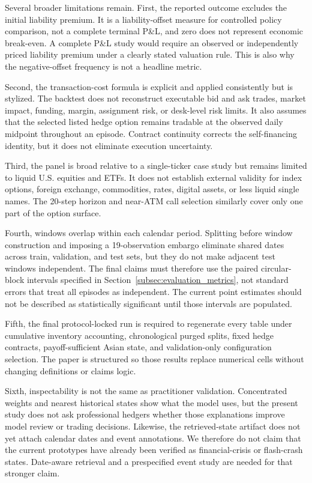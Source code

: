 \documentclass[sigconf]{acmart}
\begin{document}
Several broader limitations remain. First, the reported outcome excludes the
initial liability premium. It is a liability-offset measure for controlled
policy comparison, not a complete terminal P\&L, and zero does not represent
economic break-even. A complete P\&L study would require an observed or
independently priced liability premium under a clearly stated valuation rule.
This is also why the negative-offset frequency is not a headline metric.

Second, the transaction-cost formula is explicit and applied consistently but
is stylized. The backtest does not reconstruct executable bid and ask trades,
market impact, funding, margin, assignment risk, or desk-level risk limits. It
also assumes that the selected listed hedge option remains tradable at the
observed daily midpoint throughout an episode. Contract continuity corrects
the self-financing identity, but it does not eliminate execution uncertainty.

Third, the panel is broad relative to a single-ticker case study but remains
limited to liquid U.S. equities and ETFs. It does not establish external
validity for index options, foreign exchange, commodities, rates, digital
assets, or less liquid single names. The 20-step horizon and near-ATM call
selection similarly cover only one part of the option surface.

Fourth, windows overlap within each calendar period. Splitting before window
construction and imposing a 19-observation embargo eliminate shared dates
across train, validation, and test sets, but they do not make adjacent test
windows independent. The final claims must therefore use the paired
circular-block intervals specified in Section~\ref{subsec:evaluation_metrics},
not standard errors that treat all episodes as independent. The current point
estimates should not be described as statistically significant until those
intervals are populated.

Fifth, the final protocol-locked run is required to regenerate every table
under cumulative
inventory accounting, chronological purged splits, fixed hedge contracts,
payoff-sufficient Asian state, and validation-only configuration selection.
The paper is structured so those results replace numerical cells without
changing definitions or claims logic.

Sixth, inspectability is not the same as practitioner validation. Concentrated
weights and nearest historical states show what the model uses, but the present
study does not ask professional hedgers whether those explanations improve
model review or trading decisions. Likewise, the retrieved-state artifact does
not yet attach calendar dates and event annotations. We therefore do not claim
that the current prototypes have already been verified as financial-crisis or
flash-crash states. Date-aware retrieval and a prespecified event study are
needed for that stronger claim.
\end{document}
